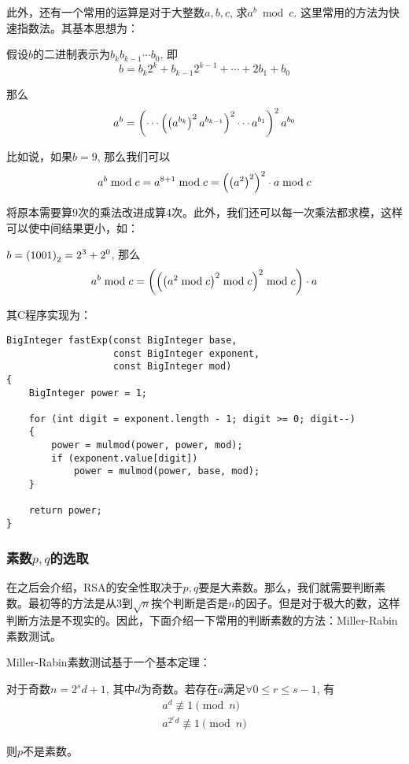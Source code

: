 此外，还有一个常用的运算是对于大整数$a, b, c$, 求$a^b\bmod{c}$. 这里常用的方法为快速指数法。其基本思想为：\par
假设$b$的二进制表示为$b_kb_{k-1}\cdots b_0$, 即
\begin{equation}
b=b_k2^k+b_{k-1}2^{k-1}+\cdots +2b_1+b_0
\end{equation}

那么
\begin{equation}
a^b=\left( {\cdots \left( {\left( {a^{b_k}}\right)^2a^{b_{k-1}}}\right)^2\cdots a^{b_{1}}}\right)^2a^{b_0}
\end{equation}

比如说，如果$b=9$, 那么我们可以
\[a^b\bmod{c}=a^{8+1}\bmod{c}=\left( {\left( {a^2}\right)^2}\right)^2\cdot a\bmod{c}\]

将原本需要算9次的乘法改进成算4次。此外，我们还可以每一次乘法都求模，这样可以使中间结果更小，如：\par
$\displaystyle b=\left( {1001}\right)_2=2^3+2^0$, 那么
\[
a^b\bmod{c}=\left( {\left( {\left( {a^2\bmod{c}}\right)^2\bmod{c}}\right)^2\bmod{c}}\right)\cdot a
\]

其C程序实现为：
\begin{prove}
\begin{verbatim}
BigInteger fastExp(const BigInteger base,
                   const BigInteger exponent,
                   const BigInteger mod)
{
    BigInteger power = 1;
    
    for (int digit = exponent.length - 1; digit >= 0; digit--)
    {
        power = mulmod(power, power, mod);
        if (exponent.value[digit])
            power = mulmod(power, base, mod);
    }
    
    return power;
}
\end{verbatim}
\end{prove}
\subsubsection{素数$p, q$的选取}
在之后会介绍，RSA的安全性取决于$p, q$要是大素数。那么，我们就需要判断素数。最初等的方法是从$3$到$\sqrt{n}$挨个判断是否是$n$的因子。但是对于极大的数，这样判断方法是不现实的。因此，下面介绍一下常用的判断素数的方法：Miller-Rabin素数测试。\par
Miller-Rabin素数测试基于一个基本定理：
\begin{theorem}
对于奇数$n=2^sd+1$, 其中$d$为奇数。若存在$a$满足$\forall 0\leq r\leq s-1$, 有
\begin{gather}
a^d\not\equiv 1\pmod{n}\\
a^{2^rd}\not\equiv 1\pmod{n}
\end{gather}

则$p$不是素数。
\end{theorem}


